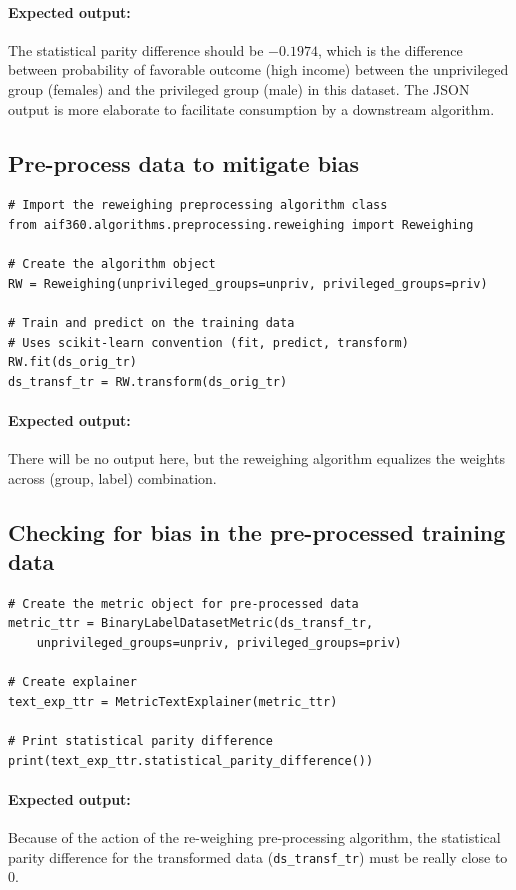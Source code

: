 \documentclass{article}
\begin{document}
\paragraph{Expected output:} The statistical parity difference should be $-0.1974$, which is the difference between probability of favorable outcome (high income) between the unprivileged group (females) and the privileged group (male) in this dataset. The JSON output is more elaborate to facilitate consumption by a downstream algorithm.

\subsection{Pre-process data to mitigate bias}
\begin{verbatim}
# Import the reweighing preprocessing algorithm class
from aif360.algorithms.preprocessing.reweighing import Reweighing
    
# Create the algorithm object
RW = Reweighing(unprivileged_groups=unpriv, privileged_groups=priv)
    
# Train and predict on the training data
# Uses scikit-learn convention (fit, predict, transform)
RW.fit(ds_orig_tr)
ds_transf_tr = RW.transform(ds_orig_tr)
\end{verbatim}

\paragraph{Expected output:} There will be no output here, but the reweighing algorithm equalizes the weights across (group, label) combination. 

\subsection{Checking for bias in the pre-processed training data}
\begin{verbatim}
# Create the metric object for pre-processed data
metric_ttr = BinaryLabelDatasetMetric(ds_transf_tr,
    unprivileged_groups=unpriv, privileged_groups=priv)
        
# Create explainer
text_exp_ttr = MetricTextExplainer(metric_ttr)

# Print statistical parity difference
print(text_exp_ttr.statistical_parity_difference())
\end{verbatim}

\paragraph{Expected output:} Because of the action of the re-weighing pre-processing algorithm, the statistical parity difference for the transformed data (\texttt{ds\_transf\_tr}) must be really close to 0.
\end{document}
